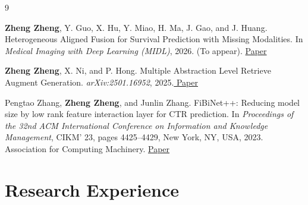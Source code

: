 \documentclass[letterpaper,11pt]{article}
\begin{document}
    \begin{thebibliography}{9}

    \textbf{Zheng Zheng}, Y. Guo, X. Hu, Y. Miao, H. Ma, J. Gao, and J. Huang.
    Heterogeneous Aligned Fusion for Survival Prediction with Missing Modalities.
    In \textit{Medical Imaging with Deep Learning (MIDL)}, 2026.
    (To appear). \href{https://openreview.net/pdf?id=XjyK23sUkI}{\color{blue}Paper}

    \textbf{Zheng Zheng}, X. Ni, and P. Hong.
    Multiple Abstraction Level Retrieve Augment Generation.
    \textit{arXiv:2501.16952}, 2025.\href{https://arxiv.org/pdf/2501.16952}{\color{blue} Paper}

    Pengtao Zhang, \textbf{Zheng Zheng}, and Junlin Zhang.
    FiBiNet++: Reducing model size by low rank feature interaction layer for CTR prediction.
    In \textit{Proceedings of the 32nd ACM International Conference on Information and Knowledge Management},
    CIKM' 23,
    pages 4425–4429, New York, NY, USA, 2023.
    Association for Computing Machinery.
    \href{https://dl.acm.org/doi/10.1145/3583780.3615242}{\color{blue} Paper}

    \end{thebibliography}
    \endgroup
        
\vspace{-7pt}

\section{Research Experience}
    
\end{document}
